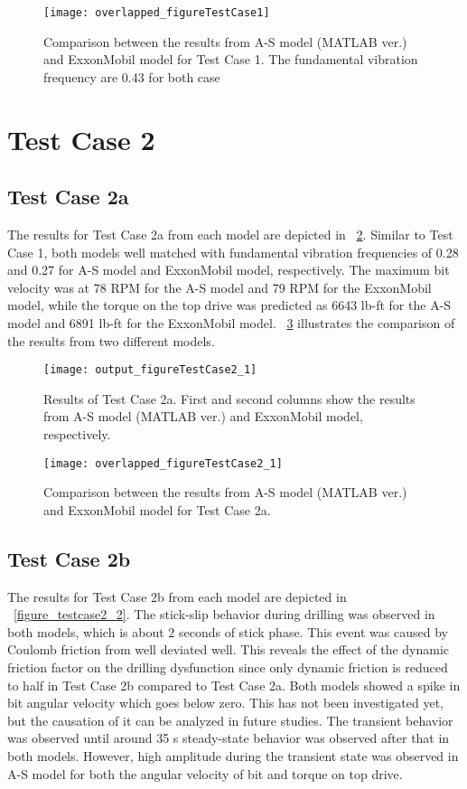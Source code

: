 \begin{figure}
  \centering
  \texttt{[image: overlapped\_figureTestCase1]}
  \caption[Comparison of the results for Test Case 1]{Comparison between the results from A-S model (MATLAB ver.) and ExxonMobil model for Test Case 1. The fundamental vibration frequency are 0.43 for both case }\label{figure_testcase1_overlapped}
\end{figure}

\section{Test Case 2}
\subsection{Test Case 2a}
The results for Test Case 2a from each model are depicted in \figurename~\ref{figure_testcase2_1}. Similar to Test Case 1, both models well matched with fundamental vibration frequencies of 0.28 and 0.27 for A-S model and ExxonMobil model, respectively. The maximum bit velocity was at 78 RPM for the A-S model and 79 RPM for the ExxonMobil model, while the torque on the top drive was predicted as 6643 lb-ft for the A-S model and 6891 lb-ft for the ExxonMobil model. \figurename~\ref{figure_testcase2_1_overlapped} illustrates the comparison of the results from two different models. 
\begin{figure}
  \centering
  \texttt{[image: output\_figureTestCase2\_1]}
  \caption[Results of Test Case 2a]{Results of Test Case 2a. First and second columns show the results from A-S model (MATLAB ver.) and ExxonMobil model, respectively.}\label{figure_testcase2_1}
\end{figure}

\begin{figure}
  \centering
  \texttt{[image: overlapped\_figureTestCase2\_1]}
  \caption[Comparison of the results for Test Case 2a]{Comparison between the results from A-S model (MATLAB ver.) and ExxonMobil model for Test Case 2a.}\label{figure_testcase2_1_overlapped}
\end{figure}


\subsection{Test Case 2b}
The results for Test Case 2b from each model are depicted in \figurename~\ref{figure_testcase2_2}. The stick-slip behavior during drilling was observed in both models, which is about 2 seconds of stick phase. This event was caused by Coulomb friction from well deviated well. This reveals the effect of the dynamic friction factor on the drilling dysfunction since only dynamic friction is reduced to half in Test Case 2b compared to Test Case 2a. Both models showed a spike in bit angular velocity which goes below zero. This has not been investigated yet, but the causation of it can be analyzed in future studies. The transient behavior was observed until around 35 s steady-state behavior was observed after that in both models. However, high amplitude during the transient state was observed in A-S model for both the angular velocity of bit and torque on top drive. 


